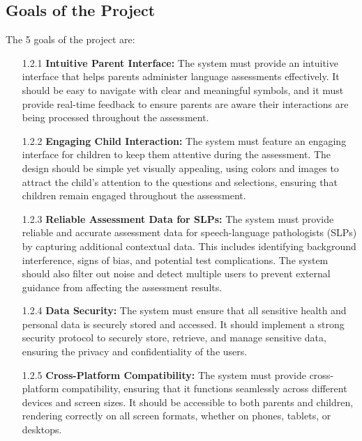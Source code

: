 \documentclass[12pt]{article}
\begin{document}
\subsection{Goals of the Project}
\hspace{2em}The 5 goals of the project are:
\begin{itemize}
  \item[1.2.1] \textbf{Intuitive Parent Interface:}  
  The system must provide an intuitive interface that helps parents administer 
  language assessments effectively. It should be easy to navigate with clear and 
  meaningful symbols, and it must provide real-time feedback to ensure parents are 
  aware their interactions are being processed throughout the assessment.

  \item[1.2.2] \textbf{Engaging Child Interaction:}  
  The system must feature an engaging interface for children to keep them attentive 
  during the assessment. The design should be simple yet visually appealing, using 
  colors and images to attract the child’s attention to the questions and selections,
  ensuring that children remain engaged throughout the assessment.

  \item[1.2.3] \textbf{Reliable Assessment Data for SLPs:}  
  The system must provide reliable and accurate assessment data for speech-language 
  pathologists (SLPs) by capturing additional contextual data. This includes 
  identifying background interference, signs of bias, and potential test 
  complications. The system should also filter out noise and detect multiple users 
  to prevent external guidance from affecting the assessment results.

  \item[1.2.4] \textbf{Data Security:}  
  The system must ensure that all sensitive health and personal data is securely 
  stored and accessed. It should implement a strong security protocol to securely 
  store, retrieve, and manage sensitive data, ensuring the privacy and confidentiality
  of the users.

  \item[1.2.5] \textbf{Cross-Platform Compatibility:}  
  The system must provide cross-platform compatibility, ensuring that it functions 
  seamlessly across different devices and screen sizes. It should be accessible to 
  both parents and children, rendering correctly on all screen formats, whether on 
  phones, tablets, or desktops.
\end{itemize}
\end{document}
